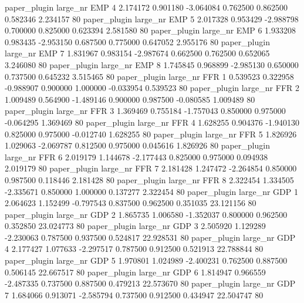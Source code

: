        paper_plugin   large_nr      EMP                 4  2.174172  0.901180  -3.064084 0.762500 0.862500  0.582346    2.234157 80
       paper_plugin   large_nr      EMP                 5  2.017328  0.953429  -2.988798 0.700000 0.825000  0.623394    2.581580 80
       paper_plugin   large_nr      EMP                 6  1.933208  0.983435  -2.953150 0.687500 0.775000  0.647052    2.955176 80
       paper_plugin   large_nr      EMP                 7  1.831967  0.983154  -2.987674 0.662500 0.762500  0.652065    3.246080 80
       paper_plugin   large_nr      EMP                 8  1.745845  0.968899  -2.985130 0.650000 0.737500  0.645232    3.515465 80
       paper_plugin   large_nr      FFR                 1  0.539523  0.322958  -0.988907 0.900000 1.000000 -0.033954    0.539523 80
       paper_plugin   large_nr      FFR                 2  1.009489  0.564900  -1.489146 0.900000 0.987500 -0.080585    1.009489 80
       paper_plugin   large_nr      FFR                 3  1.369469  0.755184  -1.757043 0.850000 0.975000 -0.064295    1.369469 80
       paper_plugin   large_nr      FFR                 4  1.628255  0.904376  -1.940130 0.825000 0.975000 -0.012740    1.628255 80
       paper_plugin   large_nr      FFR                 5  1.826926  1.029063  -2.069787 0.812500 0.975000  0.045616    1.826926 80
       paper_plugin   large_nr      FFR                 6  2.019179  1.144678  -2.177443 0.825000 0.975000  0.094938    2.019179 80
       paper_plugin   large_nr      FFR                 7  2.181428  1.247472  -2.264854 0.850000 0.987500  0.118446    2.181428 80
       paper_plugin   large_nr      FFR                 8  2.322454  1.334505  -2.335671 0.850000 1.000000  0.137277    2.322454 80
       paper_plugin   large_nr      GDP                 1  2.064623  1.152499  -0.797543 0.837500 0.962500  0.351035   23.121156 80
       paper_plugin   large_nr      GDP                 2  1.865735  1.006580  -1.352037 0.800000 0.962500  0.352850   23.024773 80
       paper_plugin   large_nr      GDP                 3  2.505920  1.129289  -2.230063 0.787500 0.937500  0.524817   22.928531 80
       paper_plugin   large_nr      GDP                 4  2.177427  1.077633  -2.297517 0.787500 0.912500  0.521913   22.788844 80
       paper_plugin   large_nr      GDP                 5  1.970801  1.024989  -2.400231 0.762500 0.887500  0.506145   22.667517 80
       paper_plugin   large_nr      GDP                 6  1.814947  0.966559  -2.487335 0.737500 0.887500  0.479213   22.573670 80
       paper_plugin   large_nr      GDP                 7  1.684066  0.913071  -2.585794 0.737500 0.912500  0.434947   22.504747 80
